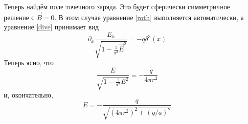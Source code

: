 \documentclass{article}
\begin{document}
Теперь найдём поле точечного заряда. Это будет сферически симметричное решение с $\vec{B} = 0$.
В этом случае уравнение \ref{roth} выполняется автоматически, а уравнение \ref{dive} принимает 
вид 
\begin{equation}
	\partial_k \frac{E_k}{\sqrt{1 - \frac{1}{a^2} \vec{E}^2}} = -q\delta^{3}(x)
\end{equation}
Теперь ясно, что
\begin{equation}
	\frac{E}{\sqrt{1 - \frac{1}{a^2} {E}^2}} = -\frac{q}{4\pi r^2}
\end{equation}
и, окончательно,
\begin{equation}
	E = - \frac{q}{\sqrt{(4\pi r^2)^2 + (q/a)^2}}
\end{equation}
\end{document}
